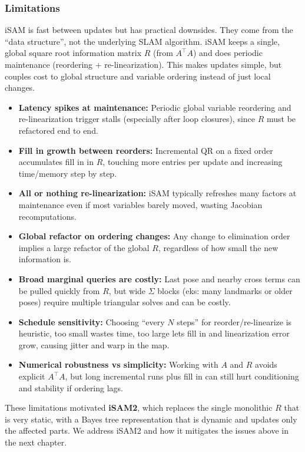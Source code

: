 \subsubsection{Limitations}
\gls{iSAM} is fast between updates but has practical downsides. They come from the ``data structure'', not the underlying \gls{SLAM} algorithm. \gls{iSAM} keeps a single, global square root information matrix $R$ (from $A^\top A$) and does periodic maintenance (reordering + re-linearization). This makes updates simple, but couples cost to global structure and variable ordering instead of just local changes.
\begin{itemize}
    \item \textbf{Latency spikes at maintenance:} Periodic global variable reordering and re-linearization trigger stalls (especially after loop closures), since $R$ must be refactored end to end.

    \item \textbf{Fill in growth between reorders:} Incremental QR on a fixed order accumulates fill in in $R$, touching more entries per update and increasing time/memory step by step.

    \item \textbf{All or nothing re-linearization:} \gls{iSAM} typically refreshes many factors at maintenance even if most variables barely moved, wasting Jacobian recomputations.

    \item \textbf{Global refactor on ordering changes:} Any change to elimination order implies a large refactor of the global $R$, regardless of how small the new information is.

    \item \textbf{Broad marginal queries are costly:} Last pose and nearby cross terms can be pulled quickly from $R$, but wide $\Sigma$ blocks (eks: many landmarks or older poses) require multiple triangular solves and can be costly.

    \item \textbf{Schedule sensitivity:} Choosing ``every $N$ steps'' for reorder/re-linearize is heuristic, too small wastes time, too large lets fill in and linearization error grow, causing jitter and warp in the map.

    \item \textbf{Numerical robustness vs simplicity:} Working with $A$ and $R$ avoids explicit $A^\top A$, but long incremental runs plus fill in can still hurt conditioning and stability if ordering lags.
\end{itemize}
\noindent
These limitations motivated \textbf{iSAM2}, which replaces the single monolithic $R$ that is very static, with a Bayes tree representation that is dynamic and updates only the affected parts. We address iSAM2 and how it mitigates the issues above in the next chapter.

